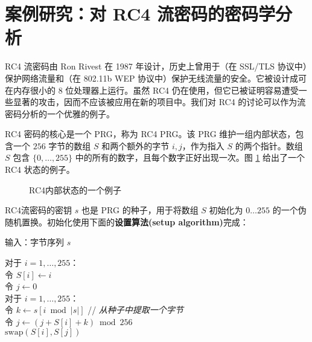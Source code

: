 \section{案例研究：对 RC4 流密码的密码学分析}\label{sec:3-9}

RC4 流密码由 Ron Rivest 在 1987 年设计，历史上曾用于（在 SSL/TLS 协议中）保护网络流量和（在 802.11b WEP 协议中）保护无线流量的安全。它被设计成可在内存很小的 $8$ 位处理器上运行。虽然 RC4 仍在使用，但它已被证明容易遭受一些显著的攻击，因而不应该被应用在新的项目中。我们对 RC4 的讨论可以作为流密码分析的一个优雅的例子。

RC4 密码的核心是一个 PRG，称为 RC4 PRG。该 PRG 维护一组内部状态，包含一个 $256$ 字节的数组 $S$ 和两个额外的字节 $i,j$，作为指入 $S$ 的两个指针。数组 $S$ 包含 $\{0,\dots,255\}$ 中的所有的数字，且每个数字正好出现一次。图 \ref{fig:3-12} 给出了一个 RC4 状态的例子。

\begin{figure}
	\centering
	
	\caption{RC4内部状态的一个例子}
	\label{fig:3-12}
\end{figure}

RC4流密码的密钥 $s$ 也是 PRG 的种子，用于将数组 $S$ 初始化为 $0 \dots 255$ 的一个伪随机置换。初始化使用下面的\textbf{设置算法(setup algorithm)}完成：

\vspace*{10pt}

\hspace*{5pt} 输入：字节序列 $s$

\vspace{5pt}

\hspace*{5pt} 对于 $i=1,\dots,255$：\\
\hspace*{50pt} 令 $S[i]\leftarrow i$ \\
\hspace*{26pt} 令 $j\leftarrow0$\\
\hspace*{26pt} 对于 $i=1,\dots,255$：\\
\hspace*{50pt} 令 $k\leftarrow s[i\bmod |s|]$ \quad\quad // \emph{从种子中提取一个字节}\\
\hspace*{50pt} 令 $j\leftarrow(j+S[i]+k)\bmod 256$\\
\hspace*{50pt} $\mathrm{swap}(S[i],S[j])$

\vspace*{10pt}

